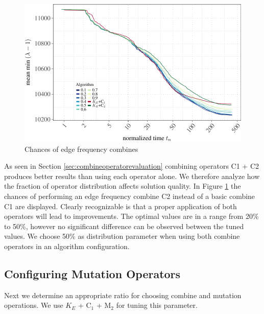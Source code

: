 \documentclass[a4paper,12pt,titlepage, BCOR7mm,headsepline]{scrbook}
\numberwithin{equation}{section}
\begin{document}
\begin{figure}[H]

\begin{center}
\includegraphics{rnw/tuning_subset_plots/edge_tuning_plot-1}\caption{Chances of edge frequency combines}\label{edge_tuning}
\end{center}
\end{figure}
As seen in Section \ref{sec:combineoperatorevaluation} combining operators C1 + C2 produces better results than using each operator alone. We therefore analyze how the fraction of operator distribution affects solution quality.
In Figure \ref{edge_tuning} the chances of performing an edge frequency combine C2 instead of a basic combine C1 are displayed. Clearly recognizable is that a proper application of both operators will lead to improvements. The optimal values are in a range from 20\% to 50\%, however no significant difference can be observed between the tuned values. We choose 50\% as distribution parameter when using both combine operators in an algorithm configuration.



\subsection{Configuring Mutation Operators}
Next we determine an appropriate ratio for choosing combine and mutation operations. We use $K_E$ + C$_1$ + M$_2$ for tuning this parameter.%
\end{document}
